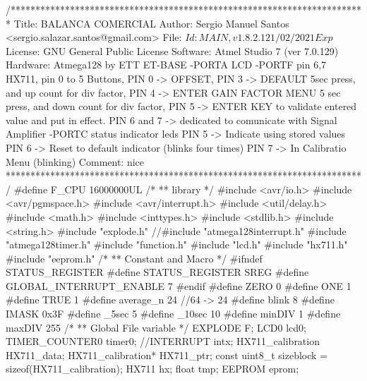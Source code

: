\begin{verbatimtab}
/************************************************************************
Title: BALANCA COMERCIAL
Author: Sergio Manuel Santos
<sergio.salazar.santos@gmail.com>
File: $Id: MAIN,v 1.8.2.1 21/02/2021 Exp $
License: GNU General Public License
Software: Atmel Studio 7 (ver 7.0.129)
Hardware: Atmega128 by ETT ET-BASE
    -PORTA LCD
    -PORTF pin 6,7 HX711, pin 0 to 5 Buttons, 
        PIN 0 -> OFFSET, 
        PIN 3 -> DEFAULT 5sec press, and up count for div factor, 
        PIN 4 -> ENTER GAIN FACTOR MENU 5 sec press, and down count for 
        div factor, 
        PIN 5 -> ENTER KEY to validate entered value and put in effect.
        PIN 6 and 7 -> dedicated to comunicate with Signal Amplifier
    -PORTC status indicator leds
        PIN 5 -> Indicate using stored values
        PIN 6 -> Reset to default indicator (blinks four times)
        PIN 7 -> In Calibratio Menu (blinking)
Comment:
    nice
************************************************************************/
#define F_CPU 16000000UL
/*
** library
*/
#include <avr/io.h>
#include <avr/pgmspace.h>
#include <avr/interrupt.h>
#include <util/delay.h>
#include <math.h>
#include <inttypes.h>
#include <stdlib.h>
#include <string.h>
#include "explode.h"
//#include "atmega128interrupt.h"
#include "atmega128timer.h"
#include "function.h"
#include "lcd.h"
#include "hx711.h"
#include "eeprom.h"
/*
** Constant and Macro
*/
#ifndef STATUS_REGISTER
#define STATUS_REGISTER SREG
#define GLOBAL_INTERRUPT_ENABLE 7
#endif
#define ZERO 0
#define ONE 1
#define TRUE 1
#define average_n 24 //64 -> 24
#define blink 8
#define IMASK 0x3F
#define _5sec 5
#define _10sec 10
#define minDIV 1
#define maxDIV 255
/*
** Global File variable
*/
EXPLODE F;
LCD0 lcd0;
TIMER_COUNTER0 timer0;
//INTERRUPT intx;
HX711_calibration HX711_data;
HX711_calibration* HX711_ptr;
const uint8_t sizeblock = sizeof(HX711_calibration);
HX711 hx;
float tmp;
EEPROM eprom;


\end{verbatimtab}
